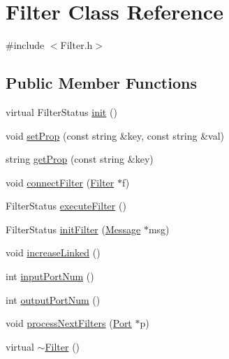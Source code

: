 \hypertarget{classFilter}{\section{Filter Class Reference}
\label{classFilter}
}


{\ttfamily \#include $<$Filter.\-h$>$}

\subsection*{Public Member Functions}
\begin{DoxyCompactItemize}
\item 
virtual Filter\-Status \hyperlink{classFilter_a16bc703e6da3656e8c86304bdda0c87e}{init} ()
\item 
void \hyperlink{classFilter_ae089d87624ac09bedb2f14c828883059}{set\-Prop} (const string \&key, const string \&val)
\item 
string \hyperlink{classFilter_a18ef0744ac52a3eacf40f3f51b94ebff}{get\-Prop} (const string \&key)
\item 
void \hyperlink{classFilter_aa5dcdeb22491c1888e66005fdec40c67}{connect\-Filter} (\hyperlink{classFilter}{Filter} $\ast$f)
\item 
Filter\-Status \hyperlink{classFilter_a4a64945919a215c51f4fb91a30c07019}{execute\-Filter} ()
\item 
Filter\-Status \hyperlink{classFilter_aa7227c3c2da4751e5bd2da7a06488a2e}{init\-Filter} (\hyperlink{classMessage}{Message} $\ast$msg)
\item 
void \hyperlink{classFilter_af03e918aa936ad6db1fe073a4c0f7936}{increase\-Linked} ()
\item 
int \hyperlink{classFilter_adc71a72a2a0547864ecfb22d5c25a296}{input\-Port\-Num} ()
\item 
int \hyperlink{classFilter_a73560f4a4872c4598f5b6842c278b34b}{output\-Port\-Num} ()
\item 
void \hyperlink{classFilter_a5c37b57c7c53d5712d28161a58ba6bb9}{process\-Next\-Filters} (\hyperlink{classPort}{Port} $\ast$p)
\item 
virtual \hyperlink{classFilter_a502ee334d42eac3edbaf32b599f9c35e}{$\sim$\-Filter} ()
\end{DoxyCompactItemize}
